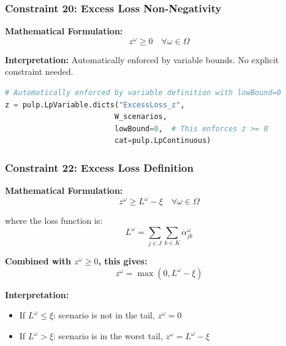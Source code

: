 \documentclass[12pt,a4paper]{article}
\begin{document}
\subsubsection{Constraint 20: Excess Loss Non-Negativity}

\begin{tcolorbox}[title=Constraint 20: Excess Loss Bounds]
\textbf{Mathematical Formulation:}
\begin{equation}
z^\omega \geq 0 \quad \forall \omega \in \Omega
\end{equation}

\textbf{Interpretation:} Automatically enforced by variable bounds. No explicit constraint needed.
\end{tcolorbox}

\begin{lstlisting}[language=Python, caption=Constraint 20 Implementation]
# Automatically enforced by variable definition with lowBound=0
z = pulp.LpVariable.dicts("ExcessLoss_z", 
                         W_scenarios, 
                         lowBound=0,  # This enforces z >= 0
                         cat=pulp.LpContinuous)
\end{lstlisting}

\subsubsection{Constraint 22: Excess Loss Definition}

\begin{tcolorbox}[title=Constraint 22: Excess Loss Calculation]
\textbf{Mathematical Formulation:}
\begin{equation}
z^\omega \geq L^\omega - \xi \quad \forall \omega \in \Omega
\end{equation}

where the loss function is:
\begin{equation}
L^\omega = \sum_{j \in J} \sum_{k \in K} \alpha_{jk}^\omega
\end{equation}

\textbf{Combined with $z^\omega \geq 0$, this gives:}
\begin{equation}
z^\omega = \max(0, L^\omega - \xi)
\end{equation}

\textbf{Interpretation:} 
\begin{itemize}
    \item If $L^\omega \leq \xi$: scenario is not in the tail, $z^\omega = 0$
    \item If $L^\omega > \xi$: scenario is in the worst tail, $z^\omega = L^\omega - \xi$
\end{itemize}
\end{tcolorbox}
\end{document}
